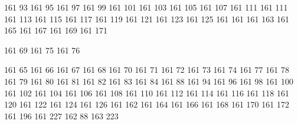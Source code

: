 


 
\startencoding[big5]

 161  93
 161  95
 161  97
 161  99
 161 101
 161 103
 161 105
 161 107
 161 111
 161 111
 161 113
 161 115
 161 117
 161 119
 161 121
 161 123
 161 125
 161 161
 161 163
 161 165
 161 167
 161 169
 161 171

 161  69
 161  75
 161  76

 161  65
 161  66
 161  67
 161  68
 161  70
 161  71
 161  72
 161  73
 161  74
 161  77
 161  78
 161  79
 161  80
 161  81
 161  82
 161  83
 161  84
 161  88
 161  94
 161  96
 161  98
 161 100
 161 102
 161 104
 161 106
 161 108
 161 110
 161 112
 161 114
 161 116
 161 118
 161 120
 161 122
 161 124
 161 126
 161 162
 161 164
 161 166
 161 168
 161 170
 161 172
 161 196
 161 227
 162  88
 163 223

